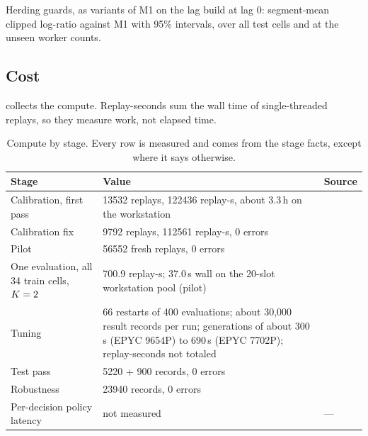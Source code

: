 \begin{table}[tbp]
  \centering
  \caption{Herding guards, as variants of M1 on the lag build at lag 0: segment-mean
    clipped log-ratio against M1 with 95\% intervals, over all test cells and at the unseen worker
    counts.}
  \label{tab:tau-hashhome}
  
\end{table}

\subsection{Cost}
\label{sec:res-cost}

 collects the compute. Replay-seconds sum the wall time of single-threaded replays, so
they measure work, not elapsed time.

\begin{table}[tbp]
  \centering\footnotesize
  \caption{Compute by stage. Every row is measured and comes from the stage facts, except where it
    says otherwise.}
  \label{tab:cost}
  \begin{tabularx}{\linewidth}{@{}lYl@{}}
    \toprule
    Stage & Value & Source \\
    \midrule
    Calibration, first pass & \num{13532} replays, \num{122436} replay-s, about 3.3\,h on the
      workstation &  \\
    Calibration fix & \num{9792} replays, \num{112561} replay-s, 0 errors &  \\
    Pilot & \num{56552} fresh replays, 0 errors &  \\
    One evaluation, all 34 train cells, $K = 2$ & 700.9 replay-s; 37.0\,s wall on the
      20-slot workstation pool (pilot) &  \\
    Tuning & 66 restarts of 400 evaluations; about 30,000 result records per run; generations of
      about 300\,s (EPYC 9654P) to 690\,s (EPYC 7702P); replay-seconds not totaled &
       \\
    Test pass & \num{5220} + 900 records, 0 errors &  \\
    Robustness & \num{23940} records, 0 errors &  \\
    Per-decision policy latency & not measured & --- \\
    \bottomrule
  \end{tabularx}
\end{table}
